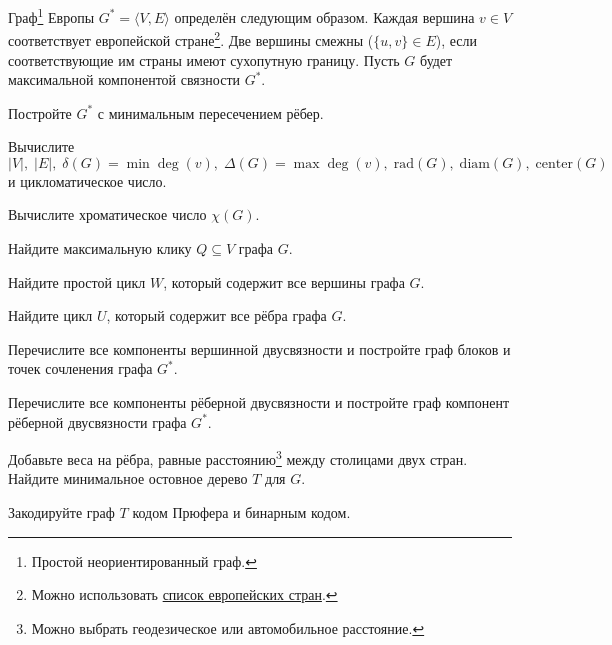 \documentclass[a4paper,12pt,oneside]{article}
\begin{document}

Граф\footnote{Простой неориентированный граф.} Европы $G^*=\langle V,E\rangle$
определён следующим образом. Каждая вершина $v\in V$ соответствует европейской
стране\footnote{Можно использовать \href{http://simple.wikipedia.org/wiki/List_of_European_countries}{список европейских стран}.}.
Две вершины смежны ($\{u,v\}\in E$), если соответствующие им страны имеют
сухопутную границу. Пусть $G$ будет максимальной компонентой связности $G^*$.

\begin{numlist}
  \item Постройте $G^*$ с минимальным пересечением рёбер.
  \item Вычислите
    \[
      |V|,\; |E|,\; \delta(G)=\min\deg(v),\; \Delta(G)=\max\deg(v),\;
      \mathrm{rad}(G),\; \mathrm{diam}(G),\; \mathrm{center}(G)
    \]
    и цикломатическое число.
  \item Вычислите хроматическое число $\chi(G)$.
  \item Найдите максимальную клику $Q\subseteq V$ графа $G$.
  \item Найдите простой цикл $W$, который содержит все вершины графа $G$.
  \item Найдите цикл $U$, который содержит все рёбра графа $G$.
  \item Перечислите все компоненты вершинной двусвязности и постройте граф
    блоков и точек сочленения графа $G^*$.
  \item Перечислите все компоненты рёберной двусвязности и постройте граф
    компонент рёберной двусвязности графа $G^*$.
  \item Добавьте веса на рёбра, равные расстоянию\footnote{Можно выбрать
    геодезическое или автомобильное расстояние.} между столицами двух стран.
    Найдите минимальное остовное дерево $T$ для $G$.
  \item Закодируйте граф $T$ кодом Прюфера и бинарным кодом.
\end{numlist}
\end{document}
